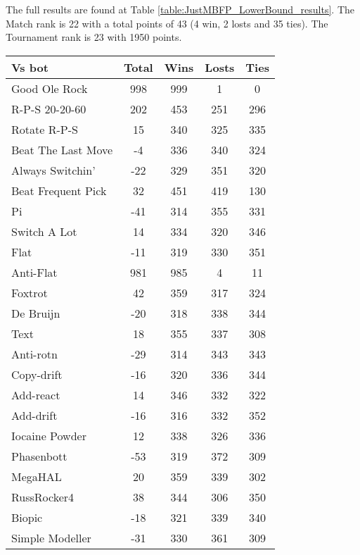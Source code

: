 The full results are found at Table \ref{table:JustMBFP_LowerBound_results}. The Match rank is 22 with a total points of 43 (4 win, 2 losts and 35 ties). The Tournament rank is 23 with 1950 points.

\begin{table*}
    \caption{MBFP\textsubscript{1} Lower Bound results}
    \label{table:JustMBFP_LowerBound_results}
    \centering
    \begin{tabular}{|l|c|c|c|c|}
        \hline
        \textbf{Vs bot} & \textbf{Total} & \textbf{Wins} & \textbf{Losts} & \textbf{Ties} \\ \hline
Good Ole Rock & 998 & 999 & 1 & 0 \\ \hline 
R-P-S 20-20-60 & 202 & 453 & 251 & 296 \\ \hline 
Rotate R-P-S & 15 & 340 & 325 & 335 \\ \hline 
Beat The Last Move & -4 & 336 & 340 & 324 \\ \hline 
Always Switchin' & -22 & 329 & 351 & 320 \\ \hline 
Beat Frequent Pick & 32 & 451 & 419 & 130 \\ \hline 
Pi & -41 & 314 & 355 & 331 \\ \hline 
Switch A Lot & 14 & 334 & 320 & 346 \\ \hline 
Flat & -11 & 319 & 330 & 351 \\ \hline 
Anti-Flat & 981 & 985 & 4 & 11 \\ \hline 
Foxtrot & 42 & 359 & 317 & 324 \\ \hline 
De Bruijn & -20 & 318 & 338 & 344 \\ \hline 
Text & 18 & 355 & 337 & 308 \\ \hline 
Anti-rotn & -29 & 314 & 343 & 343 \\ \hline 
Copy-drift & -16 & 320 & 336 & 344 \\ \hline 
Add-react & 14 & 346 & 332 & 322 \\ \hline 
Add-drift & -16 & 316 & 332 & 352 \\ \hline 
Iocaine Powder & 12 & 338 & 326 & 336 \\ \hline 
Phasenbott & -53 & 319 & 372 & 309 \\ \hline 
MegaHAL & 20 & 359 & 339 & 302 \\ \hline 
RussRocker4 & 38 & 344 & 306 & 350 \\ \hline 
Biopic & -18 & 321 & 339 & 340 \\ \hline 
Simple Modeller & -31 & 330 & 361 & 309 \\ \hline 

\end{tabular}
\end{table*}
